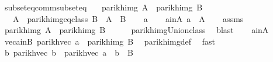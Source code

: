 \begin{isabellebody}
\isamarkupfalse%
\ subseteq{\isacharunderscore}{\kern0pt}comm{\isacharunderscore}{\kern0pt}subseteq{\isacharcolon}{\kern0pt}\isanewline
\ \ \ {\isachardoublequoteopen}parikh{\isacharunderscore}{\kern0pt}img\ A\ {\isasymsubseteq}\ parikh{\isacharunderscore}{\kern0pt}img\ B{\isachardoublequoteclose}\isanewline
\ \ \ {\isachardoublequoteopen}A\ {\isasymsubseteq}\ {\isasymUnion}{\isacharparenleft}{\kern0pt}parikh{\isacharunderscore}{\kern0pt}img{\isacharunderscore}{\kern0pt}eq{\isacharunderscore}{\kern0pt}class\ B{\isacharparenright}{\kern0pt}{\isachardoublequoteclose}\ {\isacharparenleft}{\kern0pt}\ {\isachardoublequoteopen}A\ {\isasymsubseteq}\ {\isacharquery}{\kern0pt}B{\isacharprime}{\kern0pt}{\isachardoublequoteclose}{\isacharparenright}{\kern0pt}\isanewline
%
\isadelimproof
%
\endisadelimproof
%
\isatagproof
{}\isamarkupfalse%
\isanewline
\ \ \isamarkupfalse%
\ a\isanewline
\ \ \isamarkupfalse%
\ a{\isacharunderscore}{\kern0pt}in{\isacharunderscore}{\kern0pt}A{\isacharcolon}{\kern0pt}\ {\isachardoublequoteopen}a\ {\isasymin}\ A{\isachardoublequoteclose}\isanewline
\ \ \isamarkupfalse%
\ assms\ \isamarkupfalse%
\ {\isachardoublequoteopen}parikh{\isacharunderscore}{\kern0pt}img\ A\ {\isasymsubseteq}\ parikh{\isacharunderscore}{\kern0pt}img\ {\isacharquery}{\kern0pt}B{\isacharprime}{\kern0pt}{\isachardoublequoteclose}\isanewline
\ \ \ \ \isamarkupfalse%
\ parikh{\isacharunderscore}{\kern0pt}img{\isacharunderscore}{\kern0pt}Union{\isacharunderscore}{\kern0pt}class\ \isamarkupfalse%
\ blast\isanewline
\ \ \isamarkupfalse%
\ a{\isacharunderscore}{\kern0pt}in{\isacharunderscore}{\kern0pt}A\ \isamarkupfalse%
\ vec{\isacharunderscore}{\kern0pt}a{\isacharunderscore}{\kern0pt}in{\isacharunderscore}{\kern0pt}B{\isacharprime}{\kern0pt}{\isacharcolon}{\kern0pt}\ {\isachardoublequoteopen}parikh{\isacharunderscore}{\kern0pt}vec\ a\ {\isasymin}\ parikh{\isacharunderscore}{\kern0pt}img\ {\isacharquery}{\kern0pt}B{\isacharprime}{\kern0pt}{\isachardoublequoteclose}\ \isamarkupfalse%
\ parikh{\isacharunderscore}{\kern0pt}img{\isacharunderscore}{\kern0pt}def\ \isamarkupfalse%
\ fast\isanewline
\ \ \isamarkupfalse%
\ \isamarkupfalse%
\ {\isachardoublequoteopen}{\isasymexists}b{\isachardot}{\kern0pt}\ parikh{\isacharunderscore}{\kern0pt}vec\ b\ {\isacharequal}{\kern0pt}\ parikh{\isacharunderscore}{\kern0pt}vec\ a\ {\isasymand}\ b\ {\isasymin}\ {\isacharquery}{\kern0pt}B{\isacharprime}{\kern0pt}{\isachardoublequoteclose}\isanewline

\end{isabellebody}
